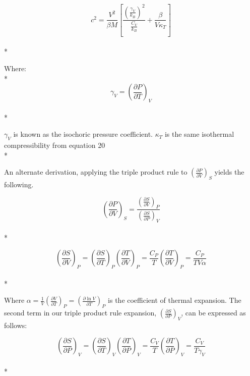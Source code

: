 \documentclass[aps,pre,nofootinbib,superscriptaddress,linenumbers,10pt, draft,tightenlines]{revtex4-1}
\begin{document}
\begin{itemize}
\begin{itemize}
        \begin{equation}c^2 = \frac{V^2}{\beta M}\left[\frac{\left(\frac{\gamma_V}{k_B}\right)^2}{\frac{C_V}{k_B}} + \frac{\beta}{V \kappa_T}\right]\end{equation}\\*
        
        Where:\\*
        \begin{equation}\gamma_V = \left(\frac{\partial P}{\partial T}\right)_{V}\end{equation}\\*
        
        $\gamma_V$ is known as the isochoric pressure coefficient. $\kappa_T$ is the same isothermal compressibility from equation 20\\*
        
        An alternate derivation, applying the triple product rule to $\left(\frac{\partial P}{\partial V}\right)_{S}$ yields the following.
        
        \begin{equation}\left(\frac{\partial P}{\partial V}\right)_{S} = \frac{\left(\frac{\partial S}{\partial V}\right)_{P}}{\left(\frac{\partial S}{\partial P}\right)_{V}}\end{equation}\\*
        
        \begin{equation}\left(\frac{\partial S}{\partial V}\right)_{P} = \left(\frac{\partial S}{\partial T}\right)_{P} \left(\frac{\partial T}{\partial V}\right)_{P} = \frac{C_P}{T} \left(\frac{\partial T}{\partial V}\right)_{P} = \frac{C_P}{T V \alpha}\end{equation}\\*
        
        Where $\alpha = \frac{1}{V} \left(\frac{\partial V}{\partial T}\right)_{P} = \left(\frac{\partial \ln V}{\partial T}\right)_{P}$ is the coefficient of thermal expansion. The second term in our triple product rule expansion, $\left(\frac{\partial S}{\partial P}\right)_{V}$, can be expressed as follows:
        
        \begin{equation}\left(\frac{\partial S}{\partial P}\right)_{V} = \left(\frac{\partial S}{\partial T}\right)_{V} \left(\frac{\partial T}{\partial P}\right)_{V} = \frac{C_V}{T} \left(\frac{\partial T}{\partial P}\right)_{V} = \frac{C_V}{T \gamma_V}\end{equation}\\* 
        

\end{itemize}
\end{itemize}
\end{document}
